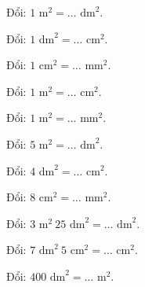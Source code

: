 \begin{ex}
Đổi: $1\text{ m}^2 = \dots\text{ dm}^2$.
\end{ex}

\begin{ex}
Đổi: $1\text{ dm}^2 = \dots\text{ cm}^2$.
\end{ex}

\begin{ex}
Đổi: $1\text{ cm}^2 = \dots\text{ mm}^2$.
\end{ex}

\begin{ex}
Đổi: $1\text{ m}^2 = \dots\text{ cm}^2$.
\end{ex}

\begin{ex}
Đổi: $1\text{ m}^2 = \dots\text{ mm}^2$.
\end{ex}

\begin{ex}
Đổi: $5\text{ m}^2 = \dots\text{ dm}^2$.
\end{ex}

\begin{ex}
Đổi: $4\text{ dm}^2 = \dots\text{ cm}^2$.
\end{ex}

\begin{ex}
Đổi: $8\text{ cm}^2 = \dots\text{ mm}^2$.
\end{ex}

\begin{ex}
Đổi: $3\text{ m}^2\ 25\text{ dm}^2 = \dots\text{ dm}^2$.
\end{ex}

\begin{ex}
Đổi: $7\text{ dm}^2\ 5\text{ cm}^2 = \dots\text{ cm}^2$.
\end{ex}

\begin{ex}
Đổi: $400\text{ dm}^2 = \dots\text{ m}^2$.
\end{ex}

